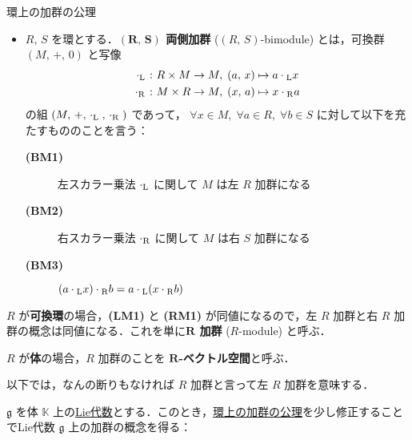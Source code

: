 \documentclass[rep_main]{subfiles}
\begin{document}
\begin{myaxiom}[label=ax:R-module,breakable]{環上の加群の公理}
\begin{itemize}
\begin{description}
		\end{description}
		\item $R,\, S$ を環とする．\textbf{$\bm{(R,\, S)}$ 両側加群} ($(R,\, S)$-bimodule) とは，可換群 $(M,\, +,\, 0)$ と写像
		\begin{align}
			\cdot{}_{\mathrm{L}} \mathrel{} &\colon R \times M \to M,\; (a,\, x) \mapsto a \cdot{}_{\mathrm{L}} x \\
			\cdot{}_{\mathrm{R}} \mathrel{} &\colon M \times R \to M,\; (x,\, a) \mapsto x \cdot{}_{\mathrm{R}} a
		\end{align}
		の組  $(M,\, +,\, \cdot{}_{\mathrm{L}}\mathrel{},\, \cdot{}_{\mathrm{R}}\mathrel{})$ であって， 
		$\forall x\in M,\; \forall a\in R,\; \forall b \in S$ に対して以下を充たすもののことを言う：
		\begin{description}
			\item[\textbf{(BM1)}] 左スカラー乗法 $\cdot{}_{\mathrm{L}}$ に関して $M$ は左 $R$ 加群になる
			\item[\textbf{(BM2)}] 右スカラー乗法 $\cdot{}_{\mathrm{R}}$ に関して $M$ は右 $S$ 加群になる
			\item[\textbf{(BM3)}] $(a \cdot{}_{\mathrm{L}} x) \cdot{}_{\mathrm{R}} b = a \cdot{}_{\mathrm{L}} (x \cdot{}_{\mathrm{R}} b)$
		\end{description}
	\end{itemize}
\end{myaxiom}

$R$ が\textbf{可換環}の場合，\textsf{\textbf{(LM1)}} と \textsf{\textbf{(RM1)}} が同値になるので，左 $R$ 加群と右 $R$ 加群の概念は同値になる．これを単に\textbf{$\bm{R}$ 加群} ($R$-module) と呼ぶ．

$R$ が\textbf{体}の場合，$R$ 加群のことを \textbf{$\bm{R}$-ベクトル空間}と呼ぶ．

\begin{marker}
	以下では，なんの断りもなければ $R$ 加群と言って左 $R$ 加群を意味する．
\end{marker}

$\mathfrak{g}$ を体 $\mathbb{K}$ 上の\hyperref[ax:LieAlg]{Lie代数}とする．このとき，\hyperref[ax:R-module]{環上の加群の公理}を少し修正することでLie代数 $\mathfrak{g}$ 上の加群の概念を得る：
\end{document}
